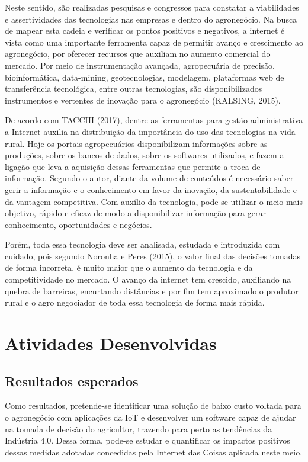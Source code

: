 \documentclass[eso]{bcc}
\begin{document}
Neste sentido, são realizadas pesquisas e congressos para constatar a viabilidades e 
assertividades das tecnologias nas empresas e dentro do agronegócio. Na busca de mapear 
esta cadeia e verificar os pontos positivos e negativos, a internet é vista como uma importante 
ferramenta capaz de permitir avanço e crescimento ao agronegócio, por oferecer recursos que 
auxiliam no aumento comercial do mercado. Por meio de instrumentação avançada, agropecuária de 
precisão, bioinformática, data-mining, geotecnologias, modelagem, plataformas web de 
transferência tecnológica, entre outras tecnologias, são disponibilizados instrumentos e 
vertentes de inovação para o agronegócio (KALSING, 2015).

De acordo com TACCHI (2017), dentre as ferramentas para gestão administrativa a Internet 
auxilia na distribuição da importância do uso das tecnologias na vida rural. Hoje os portais 
agropecuários disponibilizam informações sobre as produções, sobre os bancos de dados, sobre 
os softwares utilizados, e fazem a ligação que leva a aquisição dessas ferramentas que permite 
a troca de informação. Segundo o autor, diante da volume de conteúdos é necessário saber gerir 
a informação e o conhecimento em favor da inovação, da sustentabilidade e da vantagem competitiva. 
Com auxílio da tecnologia, pode-se utilizar o meio mais objetivo, rápido e eficaz de modo a 
disponibilizar informação para gerar conhecimento, oportunidades e negócios. 

Porém, toda essa tecnologia deve ser analisada, estudada e introduzida com cuidado, 
pois segundo Noronha e Peres (2015), o valor final das decisões tomadas de forma incorreta, 
é muito maior que o aumento da tecnologia e da competitividade no mercado. 
O avanço da internet tem crescido, auxiliando na quebra de barreiras, encurtando distâncias e 
por fim tem aproximado o produtor rural e o agro negociador de toda essa tecnologia de forma mais rápida.

\chapter{Atividades Desenvolvidas}\label{chap:atividades}

\avisoPIC{}

\section{Resultados esperados}
Como resultados, pretende-se identificar uma solução de baixo custo voltada para o agronegócio 
com aplicações da IoT e desenvolver um software capaz de ajudar na tomada de decisão do agricultor, 
trazendo para perto as tendências da Indústria 4.0. Dessa forma, pode-se estudar e quantificar os 
impactos positivos dessas medidas adotadas concedidas pela Internet das Coisas aplicada neste meio.
\end{document}
